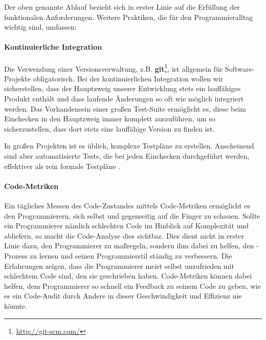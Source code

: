 Der oben genannte Ablauf bezieht sich in erster Linie auf die Erfüllung der funktionalen Anforderungen. Weitere Praktiken, die für den Programmieralltag wichtig sind, umfassen:

\paragraph{Kontinuierliche Integration} Die Verwendung einer Versionsverwaltung, z.B. \textbf{git}\footnote{\url{http://git-scm.com/}}, ist allgemein für Software-Projekte obligatorisch. Bei der kontinuierlichen Integration wollen wir sicherstellen, dass der Hauptzweig unserer Entwicklung stets ein lauffähiges Produkt enthält und dass laufende Änderungen so oft wie möglich integriert werden. Das Vorhandensein einer großen Test-Suite ermöglicht es, diese beim Einchecken in den Hauptzweig immer komplett auszuführen, um so sicherzustellen, dass dort stets eine lauffähige Version zu finden ist.

In großen Projekten ist es üblich, komplexe Testpläne zu erstellen. Anscheinend sind aber automatisierte Tests, die bei jeden Einchecken durchgeführt werden, effektiver als rein formale Testpläne \citep[S. 238]{hunt_pragmatic_1999}.

\paragraph{Code-Metriken} Ein tägliches Messen des Code-Zustandes mittels Code-Metriken ermöglicht es den Programmierern, sich selbst und gegenseitig auf die Finger zu schauen. Sollte ein Programmierer nämlich schlechten Code im Hinblick auf Komplexität und  abliefern, so macht die Code-Analyse dies sichtbar. Dies dient nicht in erster Linie dazu, den Programmierer zu maßregeln, sondern ihm dabei zu helfen, den -Prozess zu lernen und seinen Programmierstil ständig zu verbessern. Die Erfahrungen zeigen, dass die Programmierer meist selbst unzufrieden mit schlechtem Code sind, den sie geschrieben haben. Code-Metriken können dabei helfen, dem Programmierer so schnell ein Feedback zu seinem Code zu geben, wie es ein Code-Audit durch Andere in dieser Geschwindigkeit und Effizienz nie könnte.

